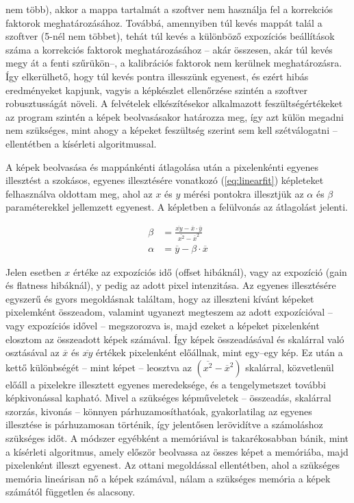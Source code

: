 \documentclass[a4paper,12pt]{article}
\begin{document}
nem több), akkor a mappa tartalmát a szoftver nem használja fel a korrekciós faktorok meghatározásához. Továbbá, amennyiben túl kevés mappát talál a szoftver (5-nél nem többet), tehát túl kevés a különböző expozíciós beállítások száma a korrekciós faktorok meghatározásához -- akár összesen, akár túl kevés megy át a fenti szűrükön--, a kalibrációs  faktorok nem kerülnek meghatározásra. Így elkerülhető, hogy túl kevés pontra illesszünk egyenest, és ezért hibás eredményeket kapjunk, vagyis a képkészlet ellenőrzése szintén a szoftver robusztusságát növeli. A felvételek elkészítésekor alkalmazott feszültségértékeket az program szintén a képek beolvasásakor határozza meg, így azt külön megadni nem szükséges, mint ahogy a képeket feszültség szerint sem kell szétválogatni -- ellentétben a kísérleti algoritmussal.

A képek beolvasása és mappánkénti  átlagolása után a pixelenkénti egyenes illesztést a szokásos, egyenes illesztésére vonatkozó (\ref{eq:linearfit}) képleteket felhasználva oldottam meg, ahol az $x$ és $y$ mérési pontokra illesztjük az $\alpha$ és $\beta$ paraméterekkel jellemzett egyenest.  A képletben a felülvonás az átlagolást jelenti.

\begin{equation}
\label{eq:linearfit}
\begin{split}
\beta &= \frac{ \overline{xy} - \overline x \cdot \overline y }{\overline{x^2} - {\overline{x}}^2}\\
\alpha &= \overline y -\beta \cdot \overline x
\end{split}
\end{equation}


Jelen esetben $x$ értéke az expozíciós idő (offset hibáknál), vagy az expozíció (gain és flatness hibáknál), y pedig az adott pixel intenzitása. Az egyenes illesztésére egyszerű és gyors megoldásnak találtam, hogy az illeszteni kívánt képeket pixelemként összeadom, valamint ugyanezt megteszem az adott expozícióval -- vagy expozíciós idővel -- megszorozva is, majd ezeket a képeket pixelenként elosztom az összeadott képek számával. Így képek összeadásával és skalárral való osztásával az $\overline x$ és $\overline{xy}$ értékek pixelenként előállnak, mint egy--egy kép. Ez után a kettő különbségét -- mint képet -- leosztva az  $\left ( \overline{x^2} - {\overline{x}}^2\right )$ skalárral, közvetlenül előáll a pixelekre illesztett egyenes meredeksége, és a tengelymetszet további képkivonással kapható. Mivel a szükséges képműveletek -- összeadás, skalárral szorzás, kivonás -- könnyen párhuzamosíthatóak, gyakorlatilag az egyenes illesztése is párhuzamosan történik, így jelentősen lerövidítve a számoláshoz szükséges időt. 
 A módszer egyébként a memóriával is takarékosabban bánik, mint a kísérleti algoritmus, amely először beolvassa az összes képet a memóriába, majd pixelenként illeszt egyenest. Az ottani megoldással ellentétben, ahol a szükséges memória lineárisan nő a képek számával, nálam a szükséges memória a képek számától független és alacsony.
\end{document}
